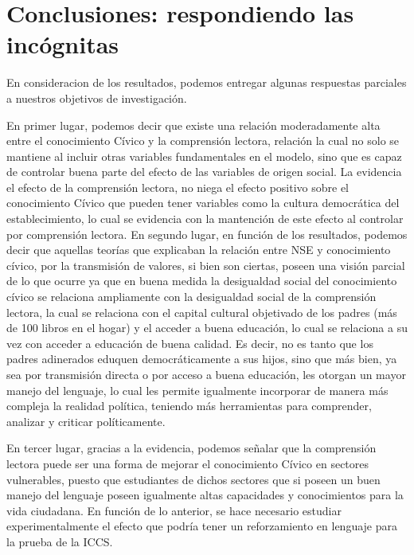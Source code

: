 \documentclass[
]{article}
\begin{document}
\hypertarget{conclusiones-respondiendo-las-incuxf3gnitas}{%
\section{Conclusiones: respondiendo las
incógnitas}\label{conclusiones-respondiendo-las-incuxf3gnitas}}

En consideracion de los resultados, podemos entregar algunas respuestas
parciales a nuestros objetivos de investigación.

En primer lugar, podemos decir que existe una relación moderadamente
alta entre el conocimiento Cívico y la comprensión lectora, relación la
cual no solo se mantiene al incluir otras variables fundamentales en el
modelo, sino que es capaz de controlar buena parte del efecto de las
variables de origen social. La evidencia el efecto de la comprensión
lectora, no niega el efecto positivo sobre el conocimiento Cívico que
pueden tener variables como la cultura democrática del establecimiento,
lo cual se evidencia con la mantención de este efecto al controlar por
comprensión lectora. En segundo lugar, en función de los resultados,
podemos decir que aquellas teorías que explicaban la relación entre NSE
y conocimiento cívico, por la transmisión de valores, si bien son
ciertas, poseen una visión parcial de lo que ocurre ya que en buena
medida la desigualdad social del conocimiento cívico se relaciona
ampliamente con la desigualdad social de la comprensión lectora, la cual
se relaciona con el capital cultural objetivado de los padres (más de
100 libros en el hogar) y el acceder a buena educación, lo cual se
relaciona a su vez con acceder a educación de buena calidad. Es decir,
no es tanto que los padres adinerados eduquen democráticamente a sus
hijos, sino que más bien, ya sea por transmisión directa o por acceso a
buena educación, les otorgan un mayor manejo del lenguaje, lo cual les
permite igualmente incorporar de manera más compleja la realidad
política, teniendo más herramientas para comprender, analizar y criticar
políticamente.

En tercer lugar, gracias a la evidencia, podemos señalar que la
comprensión lectora puede ser una forma de mejorar el conocimiento
Cívico en sectores vulnerables, puesto que estudiantes de dichos
sectores que si poseen un buen manejo del lenguaje poseen igualmente
altas capacidades y conocimientos para la vida ciudadana. En función de
lo anterior, se hace necesario estudiar experimentalmente el efecto que
podría tener un reforzamiento en lenguaje para la prueba de la ICCS.
\end{document}
